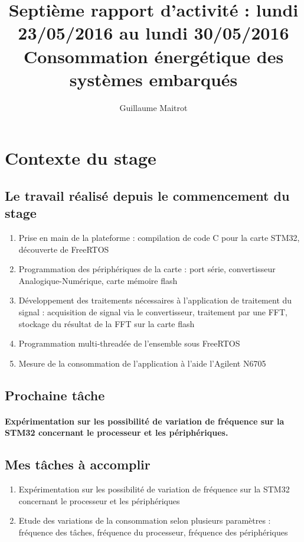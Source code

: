 \documentclass[a4paper]{article}
\title{Septième rapport d'activité : lundi 23/05/2016 au lundi 30/05/2016 }
\author{Guillaume Maitrot}
\begin{document}
\maketitle

\begin{center}
\centering
\title{Consommation énergétique des systèmes embarqués}
\end{center}

\section{Contexte du stage}

 \subsection{Le travail réalisé depuis le commencement du stage}
 \begin{enumerate}
\item {Prise en main de la plateforme : compilation de code C pour la carte STM32, découverte de FreeRTOS}
\item {Programmation des périphériques de la carte : port série,
convertisseur Analogique-Numérique, carte mémoire flash}
\item {Développement des traitements nécessaires à l'application de
traitement du signal : acquisition de signal via le convertisseur,
traitement par une FFT, stockage du résultat de la FFT sur la carte
flash}
\item { Programmation multi-threadée de l'ensemble sous FreeRTOS}
\item {Mesure de la consommation de l'application à l'aide l'Agilent
N6705}
\end{enumerate}

 \subsection{Prochaine tâche}
    \paragraph{Expérimentation sur les possibilité de variation de fréquence sur la
STM32 concernant le processeur et les périphériques.}
    
\subsection{Mes tâches à accomplir}
\begin{enumerate}
\item {Expérimentation sur les possibilité de variation de fréquence sur la
STM32 concernant le processeur et les périphériques}
\item {Etude des variations de la consommation selon plusieurs paramètres :
fréquence des tâches, fréquence du processeur, fréquence des
périphériques}
\end{enumerate}
\end{document}

